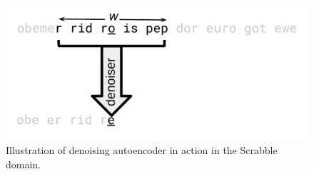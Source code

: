 \begin{figure}
  \includegraphics[width=\textwidth]{img/scrabble_denoiser_in_action}
  \caption{
    Illustration of denoising autoencoder in action in the Scrabble domain.
  }\label{fig:scrabble_denoiser_in_action}
\end{figure}

